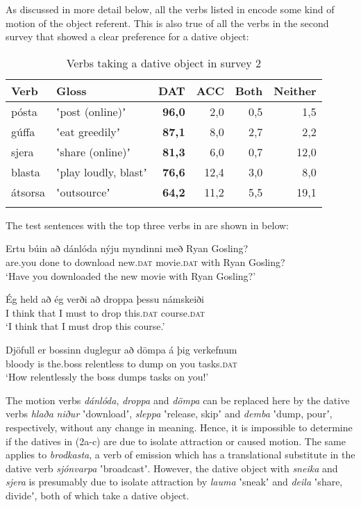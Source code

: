 \documentclass[output=paper,modfonts,nonflat]{langsci/langscibook}
\begin{document}
As discussed in more detail below, all the verbs listed in  encode some kind of motion of the object referent. This is also true of all the verbs in the second survey that showed a clear preference for a dative object:

\begin{table}
{\caption{\label{tab:jonsson:2}Verbs taking a dative object in survey 2}}
\begin{tabularx}{\textwidth}{XXrrrr}
\lsptoprule
Verb & Gloss & \textbf{DAT} & ACC & Both & Neither\\
\midrule
pósta & ʽpost (online)ʼ & \textbf{96,0} & 2,0 & 0,5 & 1,5\\
gúffa & ʽeat greedilyʼ & \textbf{87,1} & 8,0 & 2,7 & 2,2\\
sjera & ʽshare (online)ʼ & \textbf{81,3} & 6,0 & 0,7 & 12,0\\
blasta & ʽplay loudly, blastʼ & \textbf{76,6} & 12,4 & 3,0 & 8,0\\
átsorsa & ʽoutsourceʼ & \textbf{64,2} & 11,2 & 5,5 & 19,1\\
\lspbottomrule
\end{tabularx}
\end{table}

The test sentences with the top three verbs in  are shown in  below:


\ea%
    \label{ex:jonsson:2}

\ea
\gll  Ertu  búin  að  dánlóda  nýju  myndinni  með  Ryan  Gosling?\\
   are.you  done  to  download  new.\textsc{dat}  movie.\textsc{dat}  with  Ryan  Gosling?\\
\glt `Have you downloaded the new movie with Ryan Gosling?'
 

\ex
\gll   Ég  held  að  ég  verði  að  droppa  þessu  námskeiði\\
 I  think  that  I  must  to  drop  this.\textsc{dat}  course.\textsc{dat}\\
\glt `I think that I must drop this course.'
 

\ex
\gll   Djöfull  er  bossinn  duglegur  að  dömpa  á  þig  verkefnum\\
 bloody  is  the.boss  relentless  to  dump  on  you  tasks.\textsc{dat}\\
\glt `How relentlessly the boss dumps tasks on you!'
\z
\z

The motion verbs \textit{dánlóda}, \textit{droppa} and \textit{dömpa} can be replaced here by the dative verbs \textit{hlaða} \textit{niður} ʽdownloadʼ, \textit{sleppa} ʽrelease, skipʼ and \textit{demba} ʽdump, pourʼ, respectively, without any change in meaning.\textstyleFootnoteSymbol{} Hence, it is impossible to determine if the datives in (2a-c) are due to isolate attraction or caused motion. The same applies to \textit{brodkasta}, a verb of emission which has a translational substitute in the dative verb \textit{sjónvarpa} ʽbroadcastʼ. However, the dative object with \textit{sneika} and \textit{sjera} is presumably due to isolate attraction by \textit{lauma} ʽsneakʼ and \textit{deila} ʽshare, divideʼ, both of which take a dative object.
\end{document}
